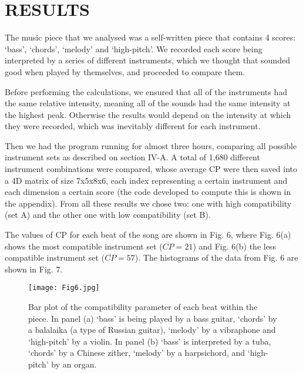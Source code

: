 \documentclass[twocolumn]{revtex4}
\begin{document}

\section{RESULTS}

The music piece that we analysed was a self-written piece that contains 4 scores: `bass', `chords', `melody' and `high-pitch'. We recorded each score being interpreted by a series of different instruments, which we thought that sounded good when played by themselves, and proceeded to compare them.

Before performing the calculations, we ensured that all of the instruments had the same relative intensity, meaning all of the sounds had the same intensity at the highest peak. Otherwise the results would depend on the intensity at which they were recorded, which was inevitably different for each instrument.

Then we had the program running for almost three hours, comparing all possible instrument sets as described on section IV-A. A total of 1,680 different instrument combinations were compared, whose average CP were then saved into a 4D matrix of size 7x5x8x6, each index representing a certain instrument and each dimension a certain score (the code developed to compute this is shown in the appendix). From all these results we chose two: one with high compatibility (set A) and the other one with low compatibility (set B).

The values of CP for each beat of the song are shown in Fig. 6, where Fig. 6(a) shows the most compatible instrument set ($\overline{CP} = 21$) and Fig. 6(b) the less compatible instrument set ($\overline{CP} = 57$). The histograms of the data from Fig. 6 are shown in Fig. 7.

\begin{figure}[h]
\centering
\texttt{[image: Fig6.jpg]}
\caption{Bar plot of the compatibility parameter of each beat within the piece. In panel (a) `bass' is being played by a bass guitar, `chords' by a balalaika (a type of Russian guitar), `melody' by a vibraphone and `high-pitch' by a violin. In panel (b) `bass' is interpreted by a tuba, `chords' by a Chinese zither, `melody' by a harpsichord, and `high-pitch' by an organ. }
\end{figure}
\end{document}
